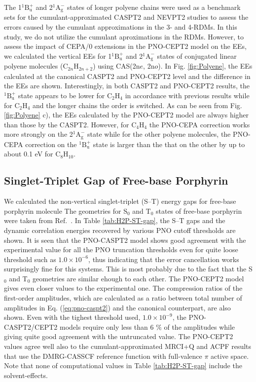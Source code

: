 \documentclass[aip,jcp,amsmath]{revtex4-1}
\begin{document}
%
The 1${}^1\text{B}_\text{u}^{+}$ and 2${}^1\text{A}_\text{g}^{-}$ states of longer polyene chains were used as a benchmark sets for the cumulant-approximated CASPT2\cite{doi:10.1063/1.4900878} and NEVPT2\cite{Zgid2009} studies to assess the errors caused by the cumulant approximations in the 3- and 4-RDMs.
%
In this study, we do not utilize the cumulant aproximations in the RDMs.
%
However, to assess the impact of CEPA/0 extensions in the PNO-CEPT2 model on the EEs, we calculated the vertical EEs for 1${}^1\text{B}_\text{u}^{+}$ and 2${}^1\text{A}_\text{g}^{-}$ states of conjugated linear polyene molecules (C${}_{2n}$H${}_{2n+2}$) using CAS(2n$e$, 2n$o$).
%
In Fig. \ref{fig:Polyene}, the EEs calculated at the canonical CASPT2 and PNO-CEPT2 level and the difference in the EEs are shown.
%
Interestingly, in both CASPT2 and PNO-CEPT2 results, the ${}^1\text{B}_\text{u}^{+}$ state appears to be lower for C${}_2$H${}_4$ in accordance with previous results\cite{doi:10.1063/1.4900878} while for C${}_2$H${}_4$ and the longer chains the order is switched.
%
As can be seen from Fig. \ref{fig:Polyene} c), the EEs calculated by the PNO-CEPT2 model are always higher than those by the CASPT2.
%
However, for C${}_4$H${}_4$ the PNO-CEPA correction works more strongly on the 2${}^1\text{A}_\text{g}^{-}$ state while for the other polyene molecules, the PNO-CEPA correction on the ${}^1\text{B}_\text{u}^{+}$ state is larger than the that on the other by up to about 0.1 eV for C${}_8$H${}_{10}$.

\subsection{Singlet-Triplet Gap of Free-base Porphyrin}
%
We calculated the non-vertical singlet-triplet (S--T) energy gaps for free-base porphyrin molecule
%
The geometries for $\text{S}_0$ and $\text{T}_0$ states of free-base porphyrin were taken from Ref.~.
%
In Table \ref{tab:H2P-ST-gap}, the S--T gaps and the dynamic correlation energies recovered by various PNO cutoff thresholds are shown.
%
It is seen that the PNO-CASPT2 model shows good agreement with the experimental value for all the PNO truncation thresholds even for quite loose threshold such as $1.0\times 10^{-6}$, thus indicating that the error cancellation works surprisingly fine for this systems.
%
This is most probably due to the fact that the S${}_0$ and T${}_0$ geometries are similar ehough to each other.
%
The PNO-CEPT2 model gives even closer values to the experimental one.
%
The compression ratios of the first-order amplitudes, which are calculated as a ratio between total number of amplitudes in Eq. (\ref{eq:pno-caspt2}) and the canonical counterpart, are also shown.
%
Even with the tighest threshold used, $1.0\times 10^{-9}$, the PNO-CASPT2/CEPT2 models require only less than 6 $\%$ of the amplitudes while giving quite good agreement with the untruncated value.
%
The PNO-CEPT2 values agree well also to the cumulant-approximated MRCI+Q and ACPF results that use the DMRG-CASSCF reference function with full-valence $\pi$ active space.
%
Note that none of computational values in Table \ref{tab:H2P-ST-gap} include the solvent-effects.
\end{document}
